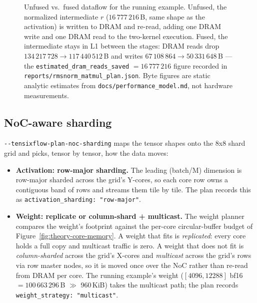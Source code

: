\begin{figure}[t]
  \caption{Unfused vs.\ fused dataflow for the running example. Unfused, the
    normalized intermediate $r$ ($16\,777\,216$\,B, same shape as the activation)
    is written to DRAM and re-read, adding one DRAM write and one DRAM read to the
    two-kernel execution. Fused, the intermediate stays in L1 between the stages:
    DRAM reads drop $134\,217\,728 \to 117\,440\,512$\,B and writes
    $67\,108\,864 \to 50\,331\,648$\,B --- the
    \texttt{estimated\_dram\_reads\_saved} $= 16\,777\,216$ figure recorded in
    \texttt{reports/rmsnorm\_matmul\_plan.json}. Byte figures are static analytic
    estimates from \texttt{docs/performance\_model.md}, not hardware measurements.}
  \label{fig:theory-fusion-dataflow}
\end{figure}

\subsection{NoC-aware sharding}

\texttt{-{}-tensixflow-plan-noc-sharding} maps the tensor shapes onto the 8x8 shard
grid and picks, tensor by tensor, how the data moves:

\begin{itemize}[nosep]
  \item \textbf{Activation: row-major sharding.} The leading (batch/M) dimension is
        row-major sharded across the grid's Y-cores, so each core row owns a
        contiguous band of rows and streams them tile by tile. The plan records
        this as \texttt{activation\_sharding: "row-major"}.
  \item \textbf{Weight: replicate or column-shard + multicast.} The weight planner
        compares the weight's footprint against the per-core circular-buffer budget
        of Figure~\ref{fig:theory-core-memory}. A weight that fits is
        \emph{replicated}: every core holds a full copy and multicast traffic is
        zero. A weight that does not fit is \emph{column-sharded} across the grid's
        X-cores and \emph{multicast} across the grid's rows via row master nodes,
        so it is moved once over the NoC rather than re-read from DRAM per core.
        The running example's weight ($[4096, 12288]$ bf16 $= 100\,663\,296$\,B
        $\gg$ 960\,KiB) takes the multicast path; the plan records
        \texttt{weight\_strategy: "multicast"}.
\end{itemize}

